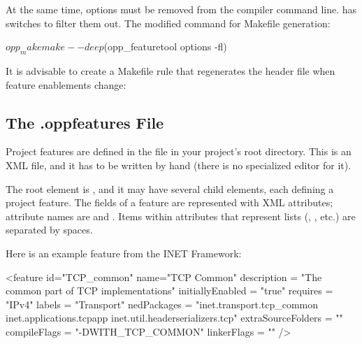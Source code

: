 
At the same time,  options must be removed from the compiler
command line.  has switches to filter them out.
The modified command for Makefile generation:

\begin{commandline}
$ opp_makemake --deep $(opp_featuretool options -fl)
\end{commandline}

It is advisable to create a Makefile rule that regenerates the header file
when feature enablements change:




\subsection{The .oppfeatures File}
\label{sec:build-sim-progs:oppfeatures-file}

Project features are defined in the  file in your project's
root directory. This is an XML file, and it has to be written by hand
(there is no specialized editor for it).

The root element is , and it may have several 
child elements, each defining a project feature. The fields of a feature
are represented with XML attributes; attribute names are  and . Items within attributes
that represent lists (, , etc.) are separated by spaces.

Here is an example feature from the INET Framework:
\begin{filelisting}
<feature
  id="TCP_common"
  name="TCP Common"
  description = "The common part of TCP implementations"
  initiallyEnabled = "true"
  requires = "IPv4"
  labels = "Transport"
  nedPackages = "inet.transport.tcp_common
                 inet.applications.tcpapp
                 inet.util.headerserializers.tcp"
  extraSourceFolders = ""
  compileFlags = "-DWITH_TCP_COMMON"
  linkerFlags = ""
  />
\end{filelisting}

